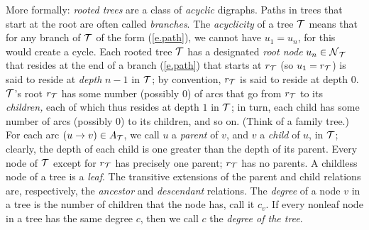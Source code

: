 More formally: {\em rooted trees} are a class of {\em acyclic}
digraphs.  Paths in trees that start at the root are often called {\em
  branches}.  The {\em acyclicity} of a tree $\mbox{$\cal T$}$ means that for any
branch of $\mbox{$\cal T$}$ of the form (\ref{e.path}), we cannot have $u_1 = u_n$,
for this would create a cycle.  Each rooted tree $\mbox{$\cal T$}$ has a designated
{\em root node} $u_n \in \mbox{$\cal N$}_{\mbox{{\scriptsize $\cal T$}}}$ that resides at the end of a branch
(\ref{e.path}) that starts at $r_{\mbox{{\scriptsize $\cal T$}}}$ (so $u_1 = r_{\mbox{{\scriptsize $\cal T$}}}$) is said
to reside at {\em depth} $n-1$ in $\mbox{$\cal T$}$; by convention, $r_{\mbox{{\scriptsize $\cal T$}}}$ is
said to reside at depth $0$.  $\mbox{$\cal T$}$'s root $r_{\mbox{{\scriptsize $\cal T$}}}$ has some number
(possibly $0$) of arcs that go from $r_{\mbox{{\scriptsize $\cal T$}}}$ to its {\em children,}
each of which thus resides at depth $1$ in $\mbox{$\cal T$}$; in turn, each child
has some number of arcs (possibly $0$) to its children, and so on.
(Think of a family tree.)  For each arc $(u \rightarrow v) \in
A_{\mbox{{\scriptsize $\cal T$}}}$, we call $u$ a {\it parent} of $v$, and $v$ a {\it child} of
$u$, in $\mbox{$\cal T$}$; clearly, the depth of each child is one greater than the
depth of its parent.  Every node of $\mbox{$\cal T$}$ except for $r_{\mbox{{\scriptsize $\cal T$}}}$ has
precisely one parent; $r_{\mbox{{\scriptsize $\cal T$}}}$ has no parents.  A childless node of a
tree is a {\em leaf}.  The transitive extensions of the parent and
child relations are, respectively, the {\em ancestor} and {\em
  descendant} relations.  The {\em degree} of a node $v$ in a tree is
the number of children that the node has, call it $c_v$.  If every
nonleaf node in a tree has the same degree $c$, then we call $c$ the
{\em degree of the tree}.

